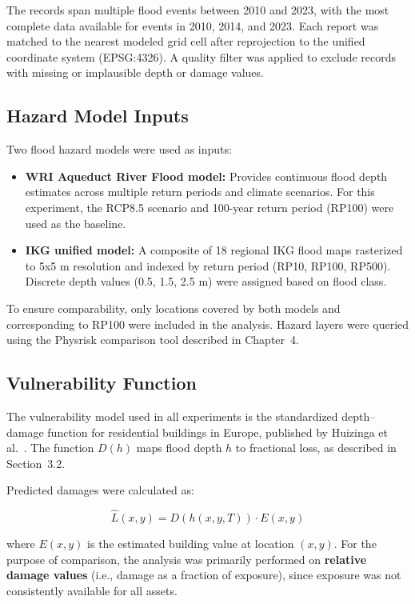 The records span multiple flood events between 2010 and 2023, with the most complete data available for events in 2010, 2014, and 2023. Each report was matched to the nearest modeled grid cell after reprojection to the unified coordinate system (EPSG:4326). A quality filter was applied to exclude records with missing or implausible depth or damage values.

\subsection{Hazard Model Inputs}

Two flood hazard models were used as inputs:

\begin{itemize}
    \item \textbf{WRI Aqueduct River Flood model:} Provides continuous flood depth estimates across multiple return periods and climate scenarios. For this experiment, the RCP8.5 scenario and 100-year return period (RP100) were used as the baseline.
    \item \textbf{IKG unified model:} A composite of 18 regional IKG flood maps rasterized to 5x5 m resolution and indexed by return period (RP10, RP100, RP500). Discrete depth values (0.5, 1.5, 2.5 m) were assigned based on flood class.
\end{itemize}

To ensure comparability, only locations covered by both models and corresponding to RP100 were included in the analysis. Hazard layers were queried using the Physrisk comparison tool described in Chapter~4.

\subsection{Vulnerability Function}

The vulnerability model used in all experiments is the standardized depth--damage function for residential buildings in Europe, published by Huizinga et al.~\cite{huizinga_global_2017}. The function $D(h)$ maps flood depth $h$ to fractional loss, as described in Section~3.2.

Predicted damages were calculated as:

\[
\widehat{L}(x, y) = D(h(x, y, T)) \cdot E(x, y)
\]

where $E(x, y)$ is the estimated building value at location $(x, y)$. For the purpose of comparison, the analysis was primarily performed on \textbf{relative damage values} (i.e., damage as a fraction of exposure), since exposure was not consistently available for all assets.


